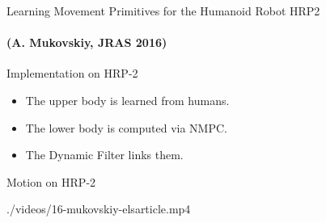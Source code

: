 
\begin{frame}{Learning Movement Primitives for the Humanoid Robot HRP2}
\framesubtitle{
  \textcolor{green!30!black!80}
  {
    (A. Mukovskiy, JRAS 2016)
  }
}
  \begin{center}
    \scalebox{0.7}{}
  \end{center}
%  
\end{frame}

\begin{frame}{Implementation on HRP-2}
  \begin{center}
    \scalebox{0.7}{}
  \end{center}
%  
  \begin{itemize}
    \item The upper body is learned from humans.
    \item The lower body is computed via NMPC.
    \item The Dynamic Filter links them.
  \end{itemize}
\end{frame}

\begin{frame}{Motion on HRP-2}
  \begin{center}
    {./videos/16-mukovskiy-elsarticle.mp4}
  \end{center}
\end{frame}



